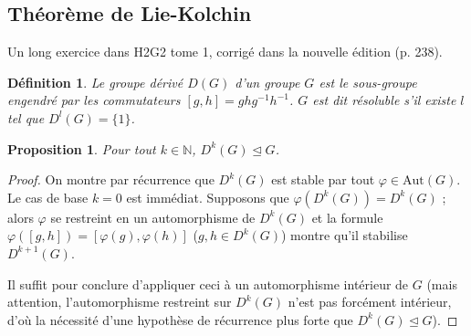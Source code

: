\documentclass[a4paper, 11pt]{article}
\def\N{\mathbb{N}}
\def\R{\mathbb{R}}
\def\M{\mathcal{M}}
\def\Tr{\textnormal{Tr}}
\def\Aut{\mathrm{Aut}}
\newtheorem*{definition}{Définition}
\newtheorem*{proposition}{Proposition}
\newtheorem*{theorem}{Théorème}
\begin{document}




\newpage

\subsection{Théorème de Lie-Kolchin}

Un long exercice dans H2G2 tome 1, corrigé dans la nouvelle édition (p. 238).

\begin{definition}
  Le \emph{groupe dérivé} $D(G)$ d'un groupe $G$ est le sous-groupe engendré par
  les commutateurs $[g,h]= ghg^{-1}h^{-1}$. $G$ est dit \emph{résoluble} s'il
  existe $l$ tel que $D^l(G) = \{1\}$.
\end{definition}
\begin{proposition}
  Pour tout $k \in \N$, $D^k(G) \trianglelefteq G$.
\end{proposition}
\begin{proof}
  On montre par récurrence que $D^k(G)$ est stable par tout $\varphi \in
  \Aut(G)$. Le cas de base $k=0$ est immédiat. Supposons que $\varphi(D^k(G)) =
  D^k(G)$ ; alors $\varphi$ se restreint en un automorphisme de $D^k(G)$ et la
  formule $\varphi([g,h]) = [\varphi(g),\varphi(h)]$ ($g,h \in D^k(G)$) montre
  qu'il stabilise $D^{k+1}(G)$.

  Il suffit pour conclure d'appliquer ceci à un automorphisme intérieur de $G$
  (mais attention, l'automorphisme restreint sur $D^k(G)$ n'est pas forcément
  intérieur, d'où la nécessité d'une hypothèse de récurrence plus forte que
  $D^k(G) \trianglelefteq G$).
\end{proof}
\end{document}
